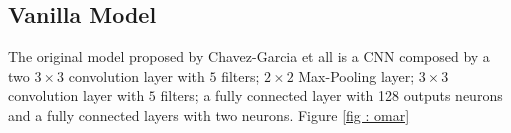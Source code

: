\documentclass[../document.tex]{subfiles}
\begin{document}
\subsection{Vanilla Model}
\label{subsec : vanilla-cnn}

The original model proposed by Chavez-Garcia et all \cite{omar2018traversability} is a CNN composed by a two $3 \times 3$ convolution layer with $5$ filters; $2 \times 2$ Max-Pooling layer; $3 \times 3$ convolution layer with $5$ filters; a fully connected layer with 128 outputs neurons and a fully connected layers with two neurons. Figure \ref{fig : omar}
\end{document}

